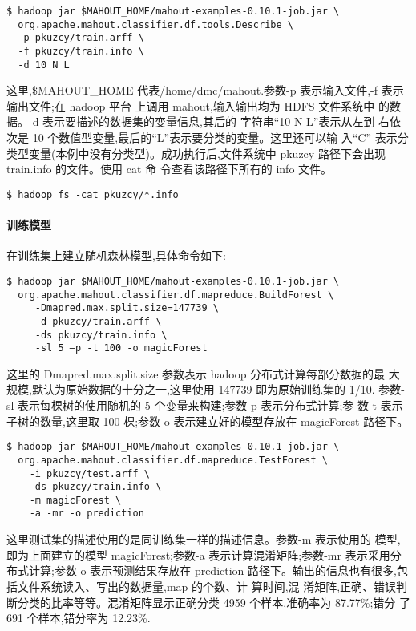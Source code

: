 \begin{lstlisting}
$ hadoop jar $MAHOUT_HOME/mahout-examples-0.10.1-job.jar \
  org.apache.mahout.classifier.df.tools.Describe \
  -p pkuzcy/train.arff \
  -f pkuzcy/train.info \
  -d 10 N L
\end{lstlisting}

这里,\$MAHOUT\_HOME 代表/home/dmc/mahout.参数-p 表示输入文件,-f
表示输出文件;在 hadoop 平台 上调用 mahout,输入输出均为 HDFS 文件系统中
的数据。-d 表示要描述的数据集的变量信息,其后的 字符串``10 N
L''表示从左到 右依次是 10
个数值型变量,最后的``L''表示要分类的变量。这里还可以输 入``C''
表示分类型变量(本例中没有分类型)。成功执行后,文件系统中 pkuzcy
路径下会出现 train.info 的文件。使用 cat 命 令查看该路径下所有的 info
文件。

\begin{lstlisting}
$ hadoop fs -cat pkuzcy/*.info
\end{lstlisting}

\paragraph{训练模型}\label{ux8badux7ec3ux6a21ux578b}

在训练集上建立随机森林模型,具体命令如下:

\begin{lstlisting}
$ hadoop jar $MAHOUT_HOME/mahout-examples-0.10.1-job.jar \
  org.apache.mahout.classifier.df.mapreduce.BuildForest \
     -Dmapred.max.split.size=147739 \
     -d pkuzcy/train.arff \
     -ds pkuzcy/train.info \
     -sl 5 –p -t 100 -o magicForest
\end{lstlisting}

这里的 Dmapred.max.split.size 参数表示 hadoop 分布式计算每部分数据的最
大规模,默认为原始数据的十分之一,这里使用 147739 即为原始训练集的 1/10.
参数-sl 表示每棵树的使用随机的 5 个变量来构建;参数-p 表示分布式计算;参
数-t 表示子树的数量,这里取 100 棵;参数-o 表示建立好的模型存放在
magicForest 路径下。

\begin{lstlisting}
$ hadoop jar $MAHOUT_HOME/mahout-examples-0.10.1-job.jar \
  org.apache.mahout.classifier.df.mapreduce.TestForest \
    -i pkuzcy/test.arff \
    -ds pkuzcy/train.info \
    -m magicForest \
    -a -mr -o prediction
\end{lstlisting}

这里测试集的描述使用的是同训练集一样的描述信息。参数-m 表示使用的
模型,即为上面建立的模型 magicForest;参数-a 表示计算混淆矩阵;参数-mr
表示采用分布式计算;参数-o 表示预测结果存放在 prediction
路径下。输出的信息也有很多,包括文件系统读入、写出的数据量,map 的个数、计
算时间,混 淆矩阵,正确、错误判断分类的比率等等。混淆矩阵显示正确分类 4959
个样本,准确率为 87.77\%;错分 了 691 个样本,错分率为 12.23\%.

